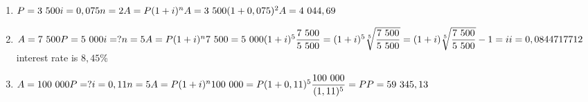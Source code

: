  \begin{solutions}{}{
\begin{enumerate}[itemsep=5pt, label=\textbf{\arabic*}. ] 


\item $P = 3~500\\
i=0,075\\
n=2\\
A=P(1 + i)^{n}\\
A = 3~500(1 + 0,075)^{2}\\
A = 4~044,69$
\item $A = 7~500
P = 5~000\\
i=?\\
n=5\\
A=P(1 + i)^{n}\\
7~500 = 5~000(1 + i)^{5}\\[4pt]
\dfrac{7~500}{5~500} = (1+i)^5\\[4pt]
\sqrt[5]{\dfrac{7~500}{5~500}} = (1+i)\\[4pt]
\sqrt[5]{\dfrac{7~500}{5~500}} - 1 = i\\[4pt]
i = 0,0844717712$\\
interest rate is $8,45 \%$
\item $A = 100~000\\
P=?\\
i=0,11\\
n=5\\
A=P(1 + i)^{n}\\
100~000 = P(1 + 0,11)^{5}\\[4pt]
\dfrac{100~000}{(1,11)^5} = P\\[4pt]
P = 59~345,13$

\end{enumerate}
}
\end{solutions}


